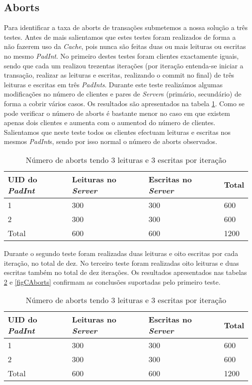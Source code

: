 \subsection{Aborts}
Para identificar a taxa de aborts de transações submetemos a nossa solução a três testes. Antes de mais salientamos que estes testes foram realizados de forma a não fazerem uso da \textit{Cache}, pois nunca são feitas duas ou mais leituras ou escritas no mesmo \textit{PadInt}. No primeiro destes testes foram clientes exactamente iguais, sendo que cada um realizou trezentas iterações (por iteração entenda-se iniciar a transação, realizar as leituras e escritas, realizando o commit no final) de três leituras e escritas em três \textit{PadInts}. Durante este teste realizámos algumas modificações no número  de clientes e pares de \textit{Server}s (primário, secundário) de forma a cobrir vários casos. Os resultados são apresentados na tabela \ref{figAAborts}. Como se pode verificar o número de aborts é bastante menor no caso em que existem apenas dois clientes e aumenta com o aumentod do número de clientes. Salientamos que neste teste todos os clientes efectuam leituras e escritas nos mesmos \textit{PadInt}s, sendo por isso normal o número de aborts observados.

\begin{table}[H]
\centering
\begin{tabular}{| p{1.5cm} | p{1.5cm} | p{1.5cm} | p{1.5cm} |}
\hline
\textbf{UID do \textit{PadInt}} & \textbf{Leituras no \textit{Server}} & \textbf{Escritas no \textit{Server}} & \textbf{Total} \\
\hline
1 & 300 & 300 & 600  \\
\hline
2 & 300 & 300 & 600  \\
\hline
Total & 600 & 600 & 1200  \\
\hline
\end{tabular}
\caption{Número de aborts tendo 3 leituras e 3 escritas por iteração} \label{figAAborts}
\end{table}

Durante o segundo teste foram realizadas duas leituras e oito escritas por cada iteração, no total de dez. No terceiro teste foram realizadas oito leituras e duas escritas também no total de dez iterações. Os resultados apresentados nas tabelas \ref{figBAborts} e \ref{figCAborts} confirmam as conclusões suportadas pelo primeiro teste.

\begin{table}[H]
\centering
\begin{tabular}{| p{1.5cm} | p{1.5cm} | p{1.5cm} | p{1.5cm} |}
\hline
\textbf{UID do \textit{PadInt}} & \textbf{Leituras no \textit{Server}} & \textbf{Escritas no \textit{Server}} & \textbf{Total} \\
\hline
1 & 300 & 300 & 600  \\
\hline
2 & 300 & 300 & 600  \\
\hline
Total & 600 & 600 & 1200  \\
\hline
\end{tabular}
\caption{Número de aborts tendo 3 leituras e 3 escritas por iteração} \label{figBAborts}
\end{table}


